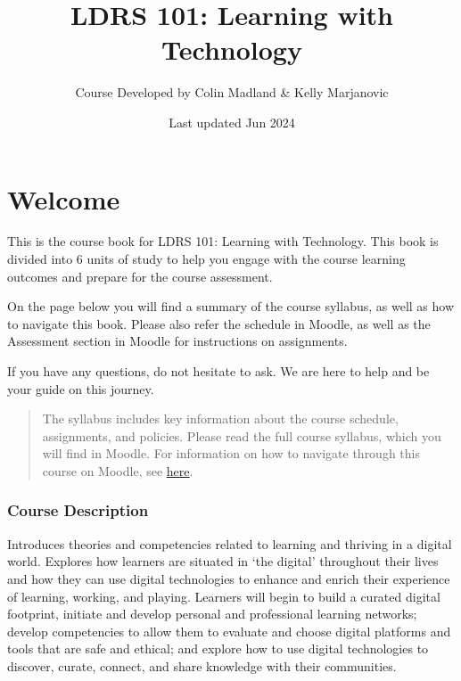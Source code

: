\documentclass[
]{book}
\title{LDRS 101: Learning with Technology}
\author{Course Developed by Colin Madland \& Kelly Marjanovic}
\date{Last updated Jun 2024}
\theoremstyle{definition}
\theoremstyle{definition}
\theoremstyle{definition}
\theoremstyle{definition}
\theoremstyle{remark}
\begin{document}
\maketitle

{
\setcounter{tocdepth}{1}
\tableofcontents
}
\hypertarget{welcome}{%
\chapter*{Welcome}\label{welcome}}

This is the course book for LDRS 101: Learning with Technology. This book is divided into 6 units of study to help you engage with the course learning outcomes and prepare for the course assessment.

On the page below you will find a summary of the course syllabus, as well as how to navigate this book. Please also refer the schedule in Moodle, as well as the Assessment section in Moodle for instructions on assignments.

If you have any questions, do not hesitate to ask. We are here to help and be your guide on this journey.

\begin{quote}
The syllabus includes key information about the course schedule, assignments, and policies. Please read the full course syllabus, which you will find in Moodle. For information on how to navigate through this course on Moodle, see \href{https://trinitywestern.teamdynamix.com/TDClient/1904/Portal/KB/?CategoryID=8214}{here}.
\end{quote}

\hypertarget{course-description}{%
\subsection*{Course Description}\label{course-description}}

Introduces theories and competencies related to learning and thriving in a digital world. Explores how learners are situated in `the digital' throughout their lives and how they can use digital technologies to enhance and enrich their experience of learning, working, and playing. Learners will begin to build a curated digital footprint, initiate and develop personal and professional learning networks; develop competencies to allow them to evaluate and choose digital platforms and tools that are safe and ethical; and explore how to use digital technologies to discover, curate, connect, and share knowledge with their communities.
\end{document}
